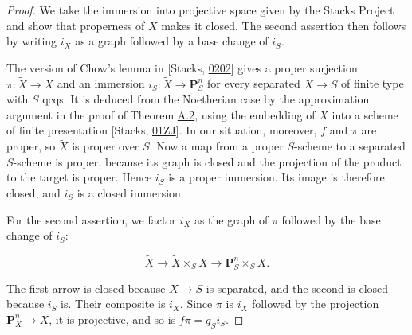 \documentclass[11pt]{article}
\begin{document}
\begin{proof}[{Proof}]\label{bp72}%
We take the immersion into projective space given by the Stacks Project and show that properness of \(X\) makes it closed. The second assertion then follows by writing \(i_X\) as a graph followed by a base change of \(i_S\).

The version of Chow's lemma in [Stacks, \href{https://stacks.math.columbia.edu/tag/0202}{0202}] gives a proper surjection \(\pi:\widetilde X\to X\) and an immersion \(i_S:\widetilde X\to\mathbf P^n_S\) for every separated \(X\to S\) of finite type with \(S\) qcqs. It is deduced from the Noetherian case by the approximation argument in the proof of Theorem \hyperref[bp7]{A.2}, using the embedding of \(X\) into a scheme of finite presentation [Stacks, \href{https://stacks.math.columbia.edu/tag/01ZJ}{01ZJ}]. In our situation, moreover, \(f\) and \(\pi\) are proper, so \(\widetilde X\) is proper over \(S\). Now a map from a proper \(S\)-scheme to a separated \(S\)-scheme is proper, because its graph is closed and the projection of the product to the target is proper. Hence \(i_S\) is a proper immersion. Its image is therefore closed, and \(i_S\) is a closed immersion.

For the second assertion, we factor \(i_X\) as the graph of \(\pi\) followed by the base change of \(i_S\):

\[
\widetilde X\longrightarrow\widetilde X\times_SX
\longrightarrow\mathbf P^n_S\times_SX.
\]

The first arrow is closed because \(X\to S\) is separated, and the second is closed because \(i_S\) is. Their composite is \(i_X\). Since \(\pi\) is \(i_X\) followed by the projection \(\mathbf P^n_X\to X\), it is projective, and so is \(f\pi=q_Si_S\).
\end{proof}



\clearpage{}\hypertarget{bp-outside}{}%
\end{document}
